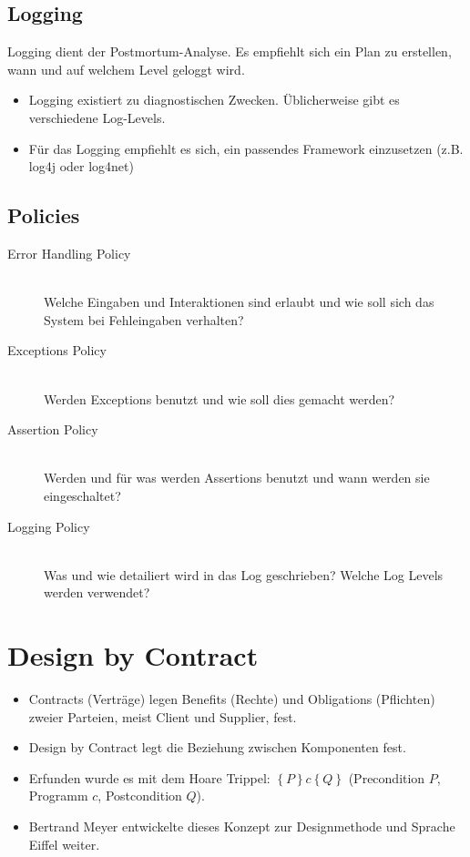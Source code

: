 \subsection{Logging}
Logging dient der Postmortum-Analyse. Es empfiehlt sich ein Plan zu erstellen, wann und auf welchem Level geloggt wird.
\begin{itemize}
	\item Logging existiert zu diagnostischen Zwecken. Üblicherweise gibt es verschiedene Log-Levels.
	\item Für das Logging empfiehlt es sich, ein passendes Framework einzusetzen (z.B. log4j oder log4net)
\end{itemize}


\subsection{Policies}

\begin{description}
	\item[Error Handling Policy] \hfill \\
	Welche Eingaben und Interaktionen sind erlaubt und wie soll sich das System bei Fehleingaben verhalten?
	\item[Exceptions Policy] \hfill \\ Werden Exceptions benutzt und wie soll dies gemacht werden?
	\item[Assertion Policy] \hfill \\ Werden und für was werden Assertions benutzt und wann werden sie eingeschaltet?
	\item[Logging Policy] \hfill \\ Was und wie detailiert wird in das Log geschrieben? Welche Log Levels werden verwendet?
\end{description}


\section{Design by Contract}

\begin{itemize}
	\item Contracts (Verträge) legen Benefits (Rechte) und Obligations (Pflichten) zweier Parteien, meist Client und Supplier, fest.
	\item Design by Contract legt die Beziehung zwischen Komponenten fest.
	\item Erfunden wurde es mit dem Hoare Trippel: $\left\{P\right\} c \left\{Q\right\}$ (Precondition $P$, Programm $c$, Postcondition $Q$). 
	\item Bertrand Meyer entwickelte dieses Konzept zur Designmethode und Sprache Eiffel weiter.
\end{itemize}


